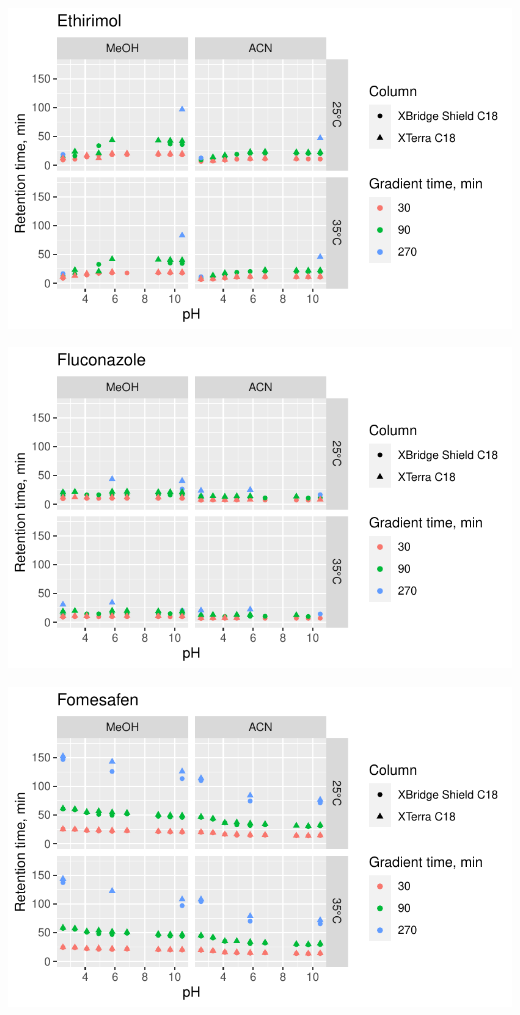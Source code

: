\documentclass[
  letterpaper,
  DIV=11,
  numbers=noendperiod]{scrreprt}
\begin{document}
\includegraphics{index_files/figure-pdf/unnamed-chunk-4-138.pdf}

\includegraphics{index_files/figure-pdf/unnamed-chunk-4-139.pdf}

\includegraphics{index_files/figure-pdf/unnamed-chunk-4-140.pdf}
\end{document}
